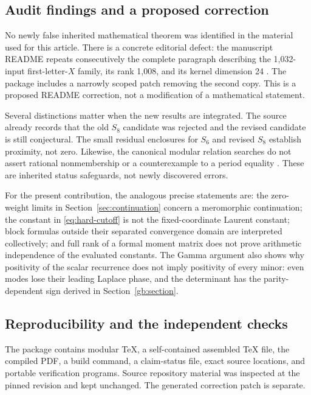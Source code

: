 \documentclass[11pt,a4paper]{article}
\numberwithin{equation}{section}
\theoremstyle{definition}
\theoremstyle{remark}
\begin{document}
\subsection{Audit findings and a proposed correction}

No newly false inherited mathematical theorem was identified in the
material used for this article. There is a concrete editorial defect:
the manuscript README repeats consecutively the complete paragraph
describing the 1,032-input first-letter-$X$ family, its rank 1,008,
and its kernel dimension 24 \cite{repo:manuscript}. The package includes
a narrowly scoped patch removing the second copy. This is a proposed
README correction, not a modification of a mathematical statement.

Several distinctions matter when the new results are integrated.
The source already records that the old $S_8$ candidate was rejected
and the revised candidate is still conjectural. The small residual
enclosures for $S_6$ and revised $S_8$ establish proximity, not zero.
Likewise, the canonical modular relation searches do not assert
rational nonmembership or a counterexample to a period equality
\cite{repo:ledger,repo:gaussian}. These are inherited status safeguards,
not newly discovered errors.

For the present contribution, the analogous precise statements are:
the zero-weight limits in Section~\ref{sec:continuation} concern a
meromorphic continuation; the constant in \eqref{eq:hard-cutoff} is
not the fixed-coordinate Laurent constant; block formulas outside
their separated convergence domain are interpreted collectively;
and full rank of a formal moment matrix does not prove arithmetic
independence of the evaluated constants. The Gamma argument also
shows why positivity of the scalar recurrence does not imply
positivity of every minor: even modes lose their leading Laplace
phase, and the determinant has the parity-dependent sign derived
in Section~\ref{gb:section}.

\subsection{Reproducibility and the independent checks}

The package contains modular TeX, a self-contained assembled TeX
file, the compiled PDF, a build command, a claim-status file, exact
source locations, and portable verification programs. Source
repository material was inspected at the pinned revision and kept
unchanged. The generated correction patch is separate.
\end{document}

